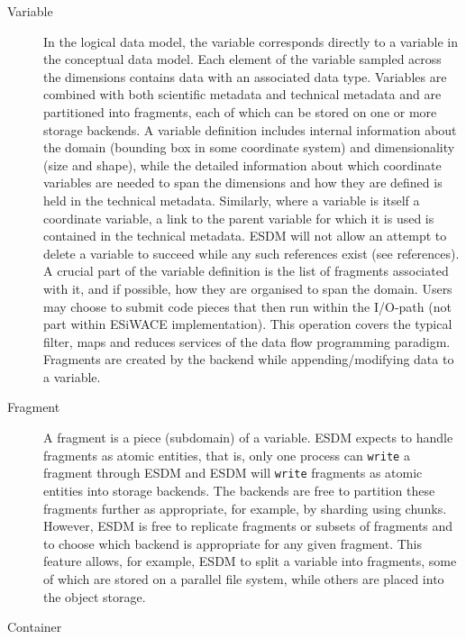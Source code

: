 \begin{description}

\item[Variable]

In the logical data model, the variable corresponds directly to a variable in the conceptual data model. Each element of the variable sampled across the dimensions contains data with an associated data type.
Variables are combined with both scientific metadata and technical metadata and are partitioned into fragments, each of which can be stored on one or more storage backends.
A variable definition includes internal information about the domain (bounding box in some coordinate system) and dimensionality (size and shape), while the detailed information about which coordinate variables are needed to span the dimensions and how they are defined is held in the technical metadata.  Similarly, where a variable is itself a coordinate variable, a link to the parent variable for which it is used is contained in the technical metadata.
ESDM will not allow an attempt to delete a variable to succeed while any such references exist (see references).
A crucial part of the variable definition is the list of fragments associated with it, and if possible, how they are organised to span the domain.
Users may choose to submit code pieces that then run within the I/O-path (not part within ESiWACE implementation). This operation covers the typical filter, maps and reduces services of the data flow programming paradigm. Fragments are created by the backend while appending/modifying data to a variable.

\item[Fragment]

A fragment is a piece (subdomain) of a variable. ESDM expects to handle fragments as atomic entities, that is, only one process can \texttt{write} a fragment through ESDM and ESDM will \texttt{write} fragments as atomic entities into storage backends.
The backends are free to partition these fragments further as appropriate, for example, by sharding using chunks.
However, ESDM is free to replicate fragments or subsets of fragments and to choose which backend is appropriate for any given fragment.
This feature allows, for example, ESDM to split a variable into fragments, some of which are stored on a parallel file system, while others are placed into the object storage.

\item[Container]


\end{description}
